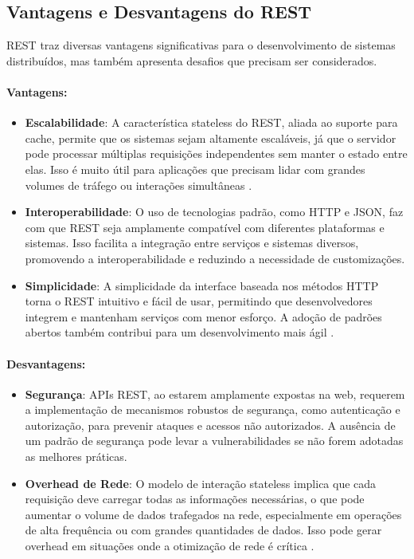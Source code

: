 \documentclass[12pt]{article}
\begin{document}
	\subsection{Vantagens e Desvantagens do REST}
	
	REST traz diversas vantagens significativas para o desenvolvimento de sistemas distribuídos, mas também apresenta desafios que precisam ser considerados.
	
	\paragraph{Vantagens:}
	\begin{itemize}
		\item \textbf{Escalabilidade}: A característica stateless do REST, aliada ao suporte para cache, permite que os sistemas sejam altamente escaláveis, já que o servidor pode processar múltiplas requisições independentes sem manter o estado entre elas. Isso é muito útil para aplicações que precisam lidar com grandes volumes de tráfego ou interações simultâneas \cite{cavaleiro2013}.
		
		\item \textbf{Interoperabilidade}: O uso de tecnologias padrão, como HTTP e JSON, faz com que REST seja amplamente compatível com diferentes plataformas e sistemas. Isso facilita a integração entre serviços e sistemas diversos, promovendo a interoperabilidade e reduzindo a necessidade de customizações.
		
		\item \textbf{Simplicidade}: A simplicidade da interface baseada nos métodos HTTP torna o REST intuitivo e fácil de usar, permitindo que desenvolvedores integrem e mantenham serviços com menor esforço. A adoção de padrões abertos também contribui para um desenvolvimento mais ágil \cite{newcomer2002}.
	\end{itemize}
	
	\paragraph{Desvantagens:}
	\begin{itemize}
		\item \textbf{Segurança}: APIs REST, ao estarem amplamente expostas na web, requerem a implementação de mecanismos robustos de segurança, como autenticação e autorização, para prevenir ataques e acessos não autorizados. A ausência de um padrão de segurança pode levar a vulnerabilidades se não forem adotadas as melhores práticas.
		
		\item \textbf{Overhead de Rede}: O modelo de interação stateless implica que cada requisição deve carregar todas as informações necessárias, o que pode aumentar o volume de dados trafegados na rede, especialmente em operações de alta frequência ou com grandes quantidades de dados. Isso pode gerar overhead em situações onde a otimização de rede é crítica \cite{fielding2000}.
	\end{itemize}
	
\end{document}
